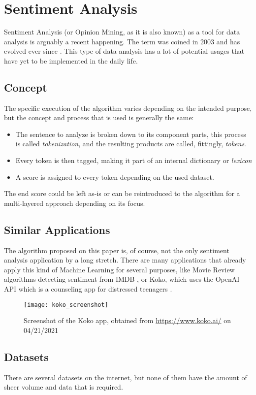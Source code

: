 \chapter{Sentiment Analysis}
Sentiment Analysis (or Opinion Mining, as it is also known) as a tool for data analysis is arguably a recent happening. The term was coined in 2003 and has evolved ever since \citep{rf3}.
This type of data analysis has a lot of potential usages that have yet to be implemented in the daily life.

\section{Concept}
The specific execution of the algorithm varies depending on the intended purpose, but the concept and process that is used is generally the same:
\begin{itemize}
	\item The sentence to analyze is broken down to its component parts, this process is called \textit{tokenization}, and the resulting products are called, fittingly, \textit{tokens}.
	\item Every token is then tagged, making it part of an internal dictionary or \textit{lexicon}
	\item A score is assigned to every token depending on the used dataset.
\end{itemize}
The end score could be left as-is or can be reintroduced to the algorithm for a multi-layered approach depending on its focus. \citep{rf4}

\section{Similar Applications}
The algorithm proposed on this paper is, of course, not the only sentiment analysis application by a long stretch. There are many applications that already apply this kind of Machine Learning for several purposes, like Movie Review algorithms detecting sentiment from IMDB \citep{rf5}, or Koko, which uses the OpenAI API which is a counseling app for distressed teenagers \citep{rf6}.
\begin{figure}[h]
	\centering
	\texttt{[image: koko\_screenshot]}
	\caption{Screenshot of the Koko app, obtained from \url{https://www.koko.ai/} on 04/21/2021}
	\label{fig:koko}
\end{figure}


\section{Datasets}
There are several datasets on the internet, but none of them have the amount of sheer volume and data that is required.

\clearpage